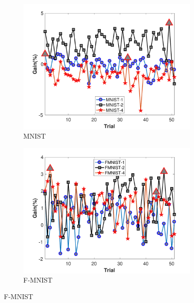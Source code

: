 \begin{figure}
	\begin{subfigure}[b]{.46\linewidth}{}
		\includegraphics[keepaspectratio = True, scale = 0.31]{figures/MNIST_25}
		\centering
		\caption{MNIST}
		\vspace{2.0em}
	\end{subfigure}
	\begin{subfigure}[b]{.46\linewidth}
		\includegraphics[keepaspectratio = True, scale = 0.31]{figures/FMNIST_25}
		\caption{F-MNIST}
		\vspace{2.0em}
	\end{subfigure}
	
	\label{fig:trial1}
\end{figure}
